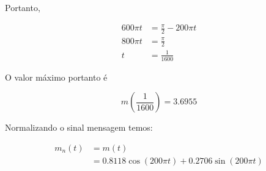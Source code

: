 \documentclass[10pt,hyperref={pdfpagemode=FullScreen},aspectratio=169]{beamer}
\begin{document}
\begin{frame}
  Portanto,

  \begin{align*} 
  600\pi t & = \frac{\pi}{2} - 200\pi t \\
  800\pi t & = \frac{\pi}{2} \\
         t & = \frac{1}{1600}
  \end{align*}
  
  O valor máximo portanto é 
  
  $$
   m \left( \frac{1}{1600}\right) = 3.6955
  $$
  
  Normalizando o sinal mensagem temos:
  
  
     \begin{align*}
     m_n(t) & =  m(t) \\
            & = 0.8118\cos(200\pi t) + 0.2706\sin(200\pi t)
     \end{align*}
\end{frame}
\end{document}
